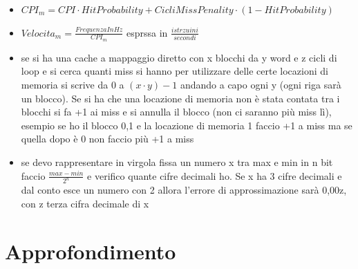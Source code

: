 \documentclass[a4paper,12pt, oneside]{book}
\begin{document}
\begin{itemize}
  \item $CPI_m=CPI\cdot HitProbability+CicliMissPenality\cdot (1-HitProbability)$
  \item $Velocita_m=\frac{FrequenzaInHz}{CPI_m}$ esprssa in $\frac{istrzuini}{secondi}$
  \item se si ha una cache a mappaggio diretto con x blocchi da y word e z cicli di loop e si cerca quanti miss si hanno per utilizzare delle certe locazioni di memoria si scrive da 0 a $(x\cdot y)-1$ andando a capo ogni y (ogni riga sarà un blocco). Se si ha che una locazione di memoria non è stata contata tra i blocchi si fa +1 ai miss e si annulla il blocco (non ci saranno più miss lì), esempio se ho il blocco 0,1 e la locazione di memoria 1 faccio +1 a miss ma se quella dopo è 0 non faccio più +1 a miss
  \item se devo rappresentare in virgola fissa un numero x tra max e min in n bit faccio $\frac{max-min}{2^n}$ e verifico quante cifre decimali ho. Se x ha 3 cifre decimali e dal conto esce un numero con 2 allora l'errore di approssimazione sarà 0,00z, con z terza cifra decimale di x

\end{itemize}
\chapter{Approfondimento}
\end{document}
